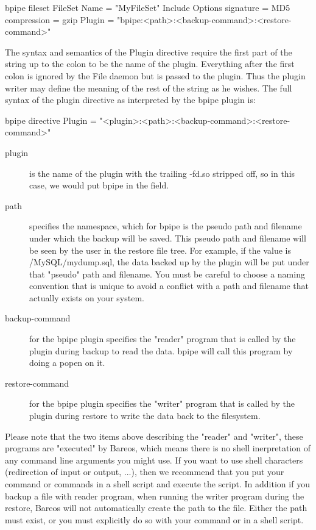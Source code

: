 \begin{bconfig}{bpipe fileset}
FileSet {
  Name = "MyFileSet"
  Include {
    Options {
      signature = MD5
      compression = gzip
    }
    Plugin = "bpipe:<path>:<backup-command>:<restore-command>"
  }
}
\end{bconfig}

The syntax and semantics of the Plugin directive require the first part of the string up to the colon to be the name of the plugin.
Everything after the first colon is ignored by the File daemon but is passed to the plugin. Thus the plugin writer may define the 
meaning of the rest of the string as he wishes. The full syntax of the plugin directive as interpreted by the bpipe plugin is:

\begin{bconfig}{bpipe directive}
Plugin = "<plugin>:<path>:<backup-command>:<restore-command>"
\end{bconfig}

\begin{description}
\item[plugin] is the name of the plugin with the trailing -fd.so stripped off, so in this case, we would put bpipe in the field.

\item[path] specifies the namespace, which for bpipe is the pseudo path and filename under which the backup will be saved. This
pseudo path and filename will be seen by the user in the restore file tree. For example, if the value is /MySQL/mydump.sql, the data
backed up by the plugin will be put under that "pseudo" path and filename. You must be careful to choose a naming convention that is unique
to avoid a conflict with a path and filename that actually exists on your system.

\item[backup-command] for the bpipe plugin specifies the "reader" program that is called by the plugin during backup to read the data. bpipe
will call this program by doing a popen on it.

\item[restore-command] for the bpipe plugin specifies the "writer" program that is called by the plugin during restore to write the data back 
to the filesystem.
\end{description}

Please note that the two items above describing the "reader" and "writer", these programs are "executed" by Bareos, which means 
there is no shell inerpretation of any command line arguments you might use. If you want to use shell characters (redirection of input 
or output, ...), then we recommend that you put your command or commands in a shell script and execute the script. In addition if you
backup a file with reader program, when running the writer program during the restore, Bareos will not automatically create the path
to the file. Either the path must exist, or you must explicitly do so with your command or in a shell script.

